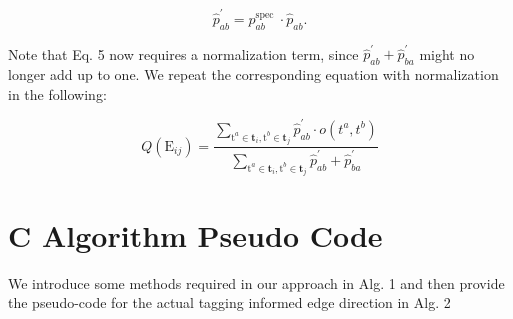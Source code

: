 \documentclass[10pt]{article}
\begin{document}
\begin{equation*}
\hat{p}_{a b}^{\prime}=p_{a b}^{\text {spec }} \cdot \hat{p}_{a b} . \tag{14}
\end{equation*}


Note that Eq. 5 now requires a normalization term, since $\hat{p}_{a b}^{\prime}+\hat{p}_{b a}^{\prime}$ might no longer add up to one. We repeat the corresponding equation with normalization in the following:


\begin{equation*}
Q\left(\mathrm{E}_{i j}\right)=\frac{\sum_{\mathrm{t}^{a} \in \mathbf{t}_{i}, \mathrm{t}^{b} \in \mathbf{t}_{j}} \hat{p}_{a b}^{\prime} \cdot o\left(t^{a}, t^{b}\right)}{\sum_{\mathrm{t}^{a} \in \mathbf{t}_{i}, \mathrm{t}^{b} \in \mathbf{t}_{j}} \hat{p}_{a b}^{\prime}+\hat{p}_{b a}^{\prime}} \tag{15}
\end{equation*}


\section*{C Algorithm Pseudo Code}
We introduce some methods required in our approach in Alg. 1 and then provide the pseudo-code for the actual tagging informed edge direction in Alg. 2
\end{document}
